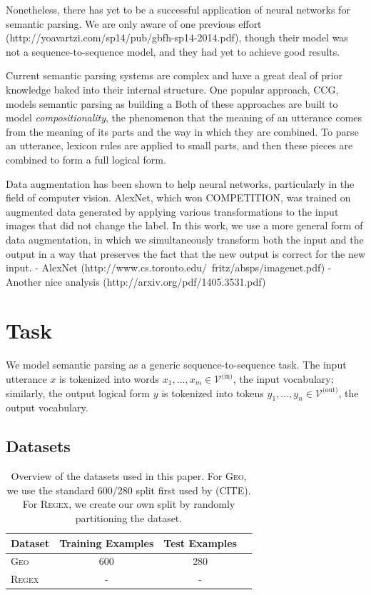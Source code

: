 \documentclass[11pt,letterpaper]{article}
\newcommand{\regex}{\textsc{Regex}\xspace}
\newcommand{\geo}{\textsc{Geo}\xspace}
\newcommand{\vocabin}{\mathcal{V}^{\text{(in)}}}
\newcommand{\vocabout}{\mathcal{V}^{\text{(out)}}}
\begin{document}
Nonetheless, there has yet to be a successful application of
neural networks for semantic parsing.
We are only aware of one previous effort 
(http://yoavartzi.com/sp14/pub/gbfh-sp14-2014.pdf),
though their model was not a sequence-to-sequence model,
and they had yet to achieve good results.

Current semantic parsing systems are
complex and have a great deal of prior knowledge
baked into their internal structure.
One popular approach, CCG, models semantic parsing as 
building a 
Both of these approaches are built to model \emph{compositionality},
the phenomenon that the meaning of an utterance comes from
the meaning of its parts and the way in which they are combined.
To parse an utterance, lexicon rules are applied to
small parts, and then these pieces are combined to form a full
logical form.

Data augmentation has been shown to help neural networks,
particularly in the field of computer vision.
AlexNet, which won COMPETITION, was trained on 
augmented data generated by applying various transformations
to the input images that did not change the label.
In this work, we use a more general form of data augmentation,
in which we simultaneously transform both the input and the output
in a way that preserves the fact that the new output is correct
for the new input.
- AlexNet (http://www.cs.toronto.edu/~fritz/absps/imagenet.pdf) 
- Another nice analysis (http://arxiv.org/pdf/1405.3531.pdf) 

\section{Task}
We model semantic parsing as a generic sequence-to-sequence task.
The input utterance $x$ is tokenized into words $x_1, \dotsc, x_m
\in \vocabin$, the input vocabulary;
similarly, the output logical form $y$ is tokenized
into tokens $y_1, \dotsc, y_n \in \vocabout$, the output vocabulary.

\subsection{Datasets}
\begin{table}[t]
  \centering
  \small
  \begin{tabular}{|l|c|c|c|}
    \hline
    Dataset & Training Examples & Test Examples \\
    \hline
    \geo & 600 & 280 \\
    \regex & - & - \\
    \hline
  \end{tabular}
  \caption{Overview of the datasets used in this paper.  
  For \geo, we use the standard 600/280 split first used by (CITE).
  For \regex, we create our own split by randomly partitioning
the dataset.}
  \label{tab:datasets}
\end{table}
\end{document}
